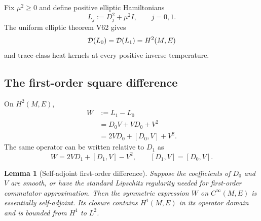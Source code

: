 \documentclass[11pt]{article}
\newtheorem{lemma}[theorem]{Lemma}
\theoremstyle{remark}
\begin{document}
Fix \(\mu^2\geq0\) and define positive elliptic Hamiltonians
\begin{equation}
 L_j:=D_j^2+\mu^2I,\qquad j=0,1.                  \tag{63.3}
\end{equation}
The uniform elliptic theorem V62 gives
\[
 {\cal D}(L_0)={\cal D}(L_1)=H^2(M,E)
\]
and trace-class heat kernels at every positive inverse temperature.

\subsection{The first-order square difference}

On \(H^2(M,E)\),
\begin{align}
 W
 &:=
 L_1-L_0                                             \nonumber\\
 &=
 D_0V+VD_0+V^2                                    \tag{63.4}\\
 &=
 2VD_0+[D_0,V]+V^2.                              \tag{63.5}
\end{align}
The same operator can be written relative to \(D_1\) as
\begin{equation}
 W=2VD_1+[D_1,V]-V^2,
 \qquad [D_1,V]=[D_0,V].                          \tag{63.6}
\end{equation}

\begin{lemma}[Self-adjoint first-order difference]
\label{lem:v12v63-selfadjoint}
Suppose the coefficients of \(D_0\) and \(V\) are smooth, or have
the standard Lipschitz regularity needed for first-order
commutator approximation.  Then the symmetric expression \(W\) on
\(C^\infty(M,E)\) is essentially self-adjoint.  Its closure contains
\(H^1(M,E)\) in its operator domain and is bounded from \(H^1\) to
\(L^2\).
\end{lemma}
\end{document}
